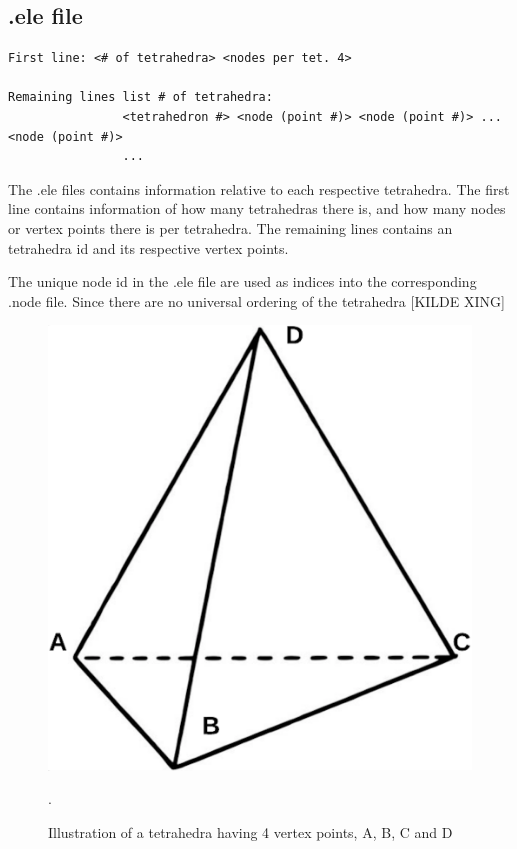 
\subsection{.ele file}
\begin{lstlisting}[caption=.ele file]
First line:	<# of tetrahedra> <nodes per tet. 4>

Remaining lines list # of tetrahedra:
				<tetrahedron #> <node (point #)> <node (point #)> ... <node (point #)>
				...
\end{lstlisting}
The .ele files contains information relative to each respective tetrahedra. The first line contains information of how many tetrahedras there is, and how many nodes or vertex points there is per tetrahedra. The remaining lines contains an tetrahedra id and its respective vertex points.

The unique node id in the .ele file are used as indices into the corresponding .node file. Since there are no universal ordering of the tetrahedra [KILDE XING]

\begin{figure}[h]
 \centering 
     \includegraphics[scale=0.4]{bilder/m_tet}
     \caption{Illustration of a tetrahedra having 4 vertex points, A, B, C and D}.
     \label{m_tet.png}
\end{figure}


